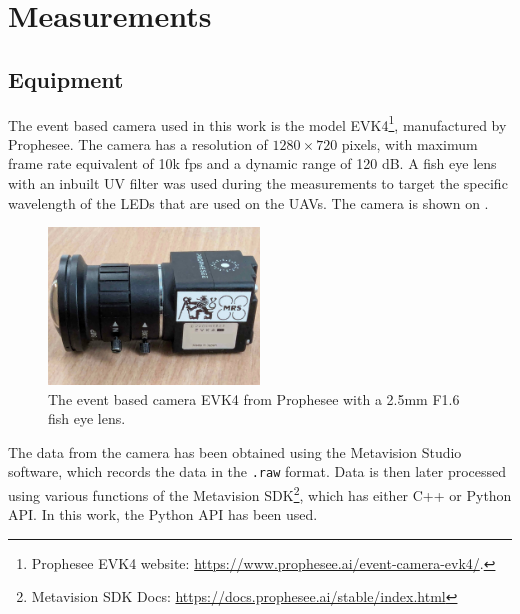 
\chapter{Measurements\label{chap:measurements}}

\section{Equipment}

The event based camera used in this work is the model EVK4\footnote{Prophesee EVK4 website: \url{https://www.prophesee.ai/event-camera-evk4/}.}, manufactured by Prophesee. The camera has a resolution of 
$1280 \times 720$ pixels, with maximum frame rate equivalent of 10k fps and a dynamic range of 120 dB.
A fish eye lens with an inbuilt UV filter was used during the measurements to target the specific wavelength of the LEDs
that are used on the UAVs. The camera is shown on . 


\begin{figure}[H]
	\centering
	\includegraphics[width=0.50\textwidth]{./fig/photos/camera_with_lens.jpg}
	\caption{The event based camera EVK4 from Prophesee with a 2.5mm F1.6 fish eye lens.}
	\label{fig:evk4}
\end{figure}

The data from the camera has been obtained using the Metavision Studio software, which records the data in the \texttt{.raw} format.
Data is then later processed using various functions of the Metavision SDK\footnote{Metavision SDK Docs: \url{https://docs.prophesee.ai/stable/index.html}},
which has either C++ or Python API. In this work, the Python API has been used.

